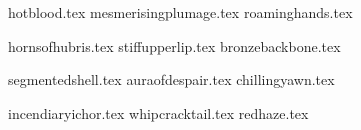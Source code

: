\begin{multicols}{2}
\endsortedpricelisthtgt

\subtitle{\manifestationsoflust}
\startsortedpricelisthtgt

{hotblood.tex}
{mesmerisingplumage.tex}
{roaminghands.tex}

\endsortedpricelisthtgt

\subtitle{\manifestationsofpride}
\startsortedpricelisthtgt

{hornsofhubris.tex}
{stiffupperlip.tex}
{bronzebackbone.tex}

\endsortedpricelisthtgt

\subtitle{\manifestationsofsloth}
\startsortedpricelisthtgt

{segmentedshell.tex}
{auraofdespair.tex}
{chillingyawn.tex}

\endsortedpricelisthtgt

\subtitle{\manifestationsofwrath}
\startsortedpricelisthtgt

{incendiaryichor.tex}
{whipcracktail.tex}
{redhaze.tex}

\endsortedpricelisthtgt
\end{multicols}
